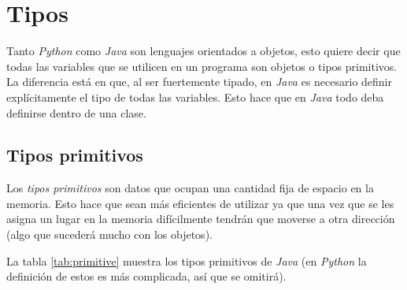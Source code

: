 \section{Tipos}
  Tanto \textit{Python} como \textit{Java} son lenguajes orientados a objetos, esto quiere
  decir que todas las variables que se utilicen en un programa son objetos o tipos 
  primitivos.
  La diferencia está en que, al ser fuertemente tipado, en \textit{Java} es necesario 
  definir explícitamente el tipo de todas las variables.
  Esto hace que en \textit{Java} todo deba definirse dentro de una clase.

  \subsection{Tipos primitivos}
    Los \textit{tipos primitivos} son datos que ocupan una cantidad fija de espacio en la
    memoria.
    Esto hace que sean más eficientes de utilizar ya que una vez que se les asigna un 
    lugar en la memoria difícilmente tendrán que moverse a otra dirección (algo que 
    sucederá mucho con los objetos).
    
    La tabla \ref{tab:primitive} muestra los tipos primitivos de \textit{Java} (en 
    \textit{Python} la definición de estos es más complicada, así que se omitirá).

